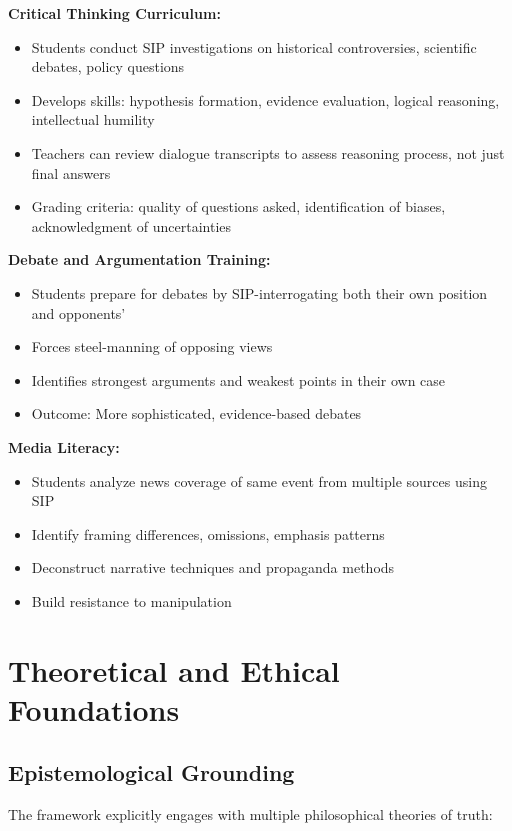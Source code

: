 \documentclass[11pt,a4paper]{article}
\begin{document}
\textbf{Critical Thinking Curriculum:}
\begin{itemize}[nosep]
    \item Students conduct SIP investigations on historical controversies, scientific debates, policy questions
    \item Develops skills: hypothesis formation, evidence evaluation, logical reasoning, intellectual humility
    \item Teachers can review dialogue transcripts to assess reasoning process, not just final answers
    \item Grading criteria: quality of questions asked, identification of biases, acknowledgment of uncertainties
\end{itemize}

\textbf{Debate and Argumentation Training:}
\begin{itemize}[nosep]
    \item Students prepare for debates by SIP-interrogating both their own position and opponents'
    \item Forces steel-manning of opposing views
    \item Identifies strongest arguments and weakest points in their own case
    \item Outcome: More sophisticated, evidence-based debates
\end{itemize}

\textbf{Media Literacy:}
\begin{itemize}[nosep]
    \item Students analyze news coverage of same event from multiple sources using SIP
    \item Identify framing differences, omissions, emphasis patterns
    \item Deconstruct narrative techniques and propaganda methods
    \item Build resistance to manipulation
\end{itemize}

\section{Theoretical and Ethical Foundations}

\subsection{Epistemological Grounding}

The framework explicitly engages with multiple philosophical theories of truth:
\end{document}
